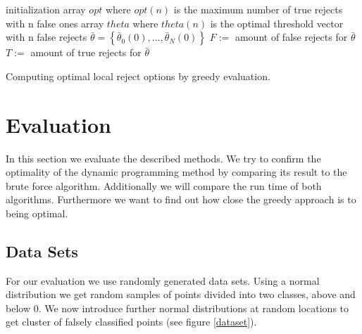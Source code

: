 \begin{algorithm}[!htbp]
 initialization\;
 array $opt$ where $opt(n)$ is the maximum number of true rejects with n false ones \;
 array $theta$ where $theta(n)$ is the optimal threshold vector with n false rejects \; 
 $\bar{\theta} = \left\{\bar{\theta}_0(0),...,\bar{\theta}_N(0)\right\}$ \; 
 $F :=$ amount of false rejects for $\bar{\theta}$ \;
 $T :=$ amount of true rejects for $\bar{\theta}$ \;
 \BlankLine \BlankLine
 \caption{Computing optimal local reject options by greedy evaluation.}
 \label{greedy}
\end{algorithm}

\section{Evaluation}
In this section we evaluate the described methods. We try to confirm the optimality of the dynamic programming method by comparing its result to the brute force algorithm. Additionally we will compare the run time of both algorithms. Furthermore we want to find out how close the greedy approach is to being optimal.

\subsection{Data Sets}
For our evaluation we use randomly generated data sets. Using a normal distribution we get random samples of points divided into two classes, above and below $0$. We now introduce further normal distributions at random locations to get cluster of falsely classified points (see figure \ref{dataset}).

